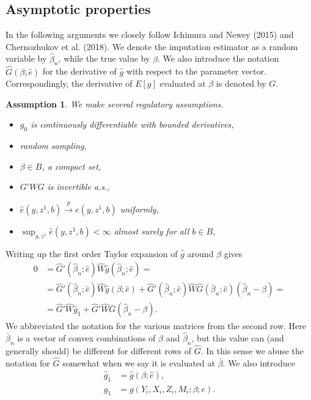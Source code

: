 \documentclass{article}
\newtheorem{assumption}{Assumption}
\theoremstyle{definition}
\theoremstyle{remark}
\begin{document}
\subsection{Asymptotic properties}
In the following arguments we closely follow Ichimura and Newey (2015) and Chernozhukov et al. (2018). We denote the imputation estimator as a random variable by $\hat{\beta}_n$, while the true value by $\beta$. We also introduce the notation $\hat{G}(\beta;\hat{e})$ for the derivative of $\hat{g}$ with respect to the parameter vector. Correspondingly, the derivative of $E[g]$ evaluated at $\beta$ is denoted by $G$.

\begin{assumption}\label{ass_regulatory1}
	We make several regulatory assumptions.
	\begin{itemize}
		\item $g_0$ is continuously differentiable with bounded derivatives,
		\item random sampling,
		\item $\beta \in B$, a compact set,
		\item $G'WG$ is invertible a.s.,
		\item $\hat{e}(y,z^1, b)\stackrel{p}{\rightarrow} e(y,z^1, b)$ uniformly,
		\item $\sup_{y,z^1}\hat{e}(y,z^1, b)<\infty$ almost surely for all $b \in B$,
	\end{itemize}
\end{assumption}

Writing up the first order Taylor expansion of $\hat{g}$ around $\beta$ gives
\begin{align}
    0&=\hat{G}'(\hat{\beta}_n;\hat{e})\hat{W}\hat{g}(\hat{\beta}_n;\hat{e})= \\ &=\hat{G}'(\hat{\beta}_n;\hat{e})\hat{W}\hat{g}(\beta;\hat{e})+ \hat{G}'(\hat{\beta}_n;\hat{e})\hat{W}\hat{G}(\bar{\beta}_n;\hat{e})(\hat{\beta}_n-\beta)= \nonumber \\
    &= \hat{G}'\hat{W}\hat{g}_1+ \hat{G}'\hat{W}\bar{G}(\hat{\beta}_n-\beta). \nonumber
    \end{align}
We abbreviated the notation for the various matrices from the second row. Here $\bar{\beta}_n$ is a vector of convex combinations of $\beta$ and $\hat{\beta}_n$, but this value can (and generally should) be different for different rows of $\hat{G}$. In this sense we abuse the notation for $\hat{G}$ somewhat when we say it is evaluated at $\bar{\beta}$. We also introduce
\begin{align}
\hat{g}_1&=\hat{g}(\beta;\hat{e}), \\
g_1 &= g(Y_i, X_i, Z_i, M_i; \beta; e).
\end{align}
\end{document}
